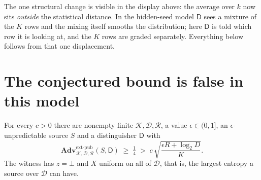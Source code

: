 \documentclass{aicr-solution}
\newcommand{\Adv}{\mathbf{Adv}}
\newcommand{\extp}{\mathrm{ext}\text{-}\mathrm{pub}}
\newcommand{\calK}{\mathcal{K}}
\newcommand{\calD}{\mathcal{D}}
\newcommand{\calR}{\mathcal{R}}
\begin{document}
The one structural change is visible in the display above: the average over $k$ now sits
\emph{outside} the statistical distance. In the hidden-seed model $\mathsf{D}$ sees a mixture of
the $K$ rows and the mixing itself smooths the distribution; here $\mathsf{D}$ is told which row it
is looking at, and the $K$ rows are graded separately. Everything below follows from that one
displacement.

\section{The conjectured bound is false in this model}\label{sec:false}

\begin{proposition}\label{prop:false}
For every $c > 0$ there are nonempty finite $\calK, \calD, \calR$, a value $\epsilon \in (0,1]$, an
$\epsilon$-unpredictable source $S$ and a distinguisher $\mathsf{D}$ with
\[
  \Adv^{\extp}_{\calK,\calD,\calR}(S,\mathsf{D}) \;\ge\; \tfrac14
  \;>\; c\,\sqrt{\frac{\epsilon R + \log_2 D}{K}} .
\]
The witness has $z = \bot$ and $X$ uniform on all of $\calD$, that is, the largest entropy a
source over $\calD$ can have.
\end{proposition}
\end{document}
